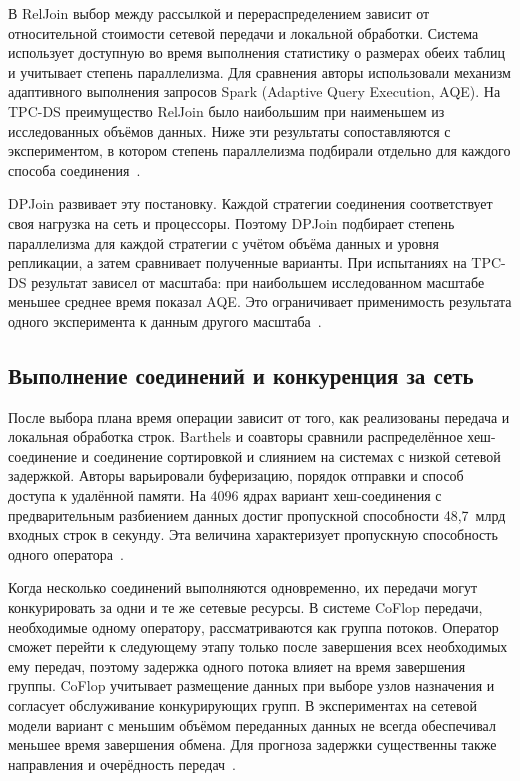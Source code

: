 \documentclass[a4paper, final]{article}
\begin{document}
	В RelJoin выбор между рассылкой и перераспределением зависит от относительной стоимости сетевой передачи и локальной обработки. Система использует доступную во время выполнения статистику о размерах обеих таблиц и учитывает степень параллелизма. Для сравнения авторы использовали механизм адаптивного выполнения запросов Spark (Adaptive Query Execution, AQE). На TPC-DS преимущество RelJoin было наибольшим при наименьшем из исследованных объёмов данных. Ниже эти результаты сопоставляются с экспериментом, в котором степень параллелизма подбирали отдельно для каждого способа соединения~\cite{liang2024,turkmen2026}.
	
	DPJoin развивает эту постановку. Каждой стратегии соединения соответствует своя нагрузка на сеть и процессоры. Поэтому DPJoin подбирает степень параллелизма для каждой стратегии с учётом объёма данных и уровня репликации, а затем сравнивает полученные варианты. При испытаниях на TPC-DS результат зависел от масштаба: при наибольшем исследованном масштабе меньшее среднее время показал AQE. Это ограничивает применимость результата одного эксперимента к данным другого масштаба~\cite{turkmen2026}.
	
	\subsection{Выполнение соединений и конкуренция за сеть}
	
	После выбора плана время операции зависит от того, как реализованы передача и локальная обработка строк. Barthels и соавторы сравнили распределённое хеш-соединение и соединение сортировкой и слиянием на системах с низкой сетевой задержкой. Авторы варьировали буферизацию, порядок отправки и способ доступа к удалённой памяти. На 4096 ядрах вариант хеш-соединения с предварительным разбиением данных достиг пропускной способности 48,7~млрд входных строк в секунду. Эта величина характеризует пропускную способность одного оператора~\cite{barthels2017}.
	
	Когда несколько соединений выполняются одновременно, их передачи могут конкурировать за одни и те же сетевые ресурсы. В системе CoFlop передачи, необходимые одному оператору, рассматриваются как группа потоков. Оператор сможет перейти к следующему этапу только после завершения всех необходимых ему передач, поэтому задержка одного потока влияет на время завершения группы. CoFlop учитывает размещение данных при выборе узлов назначения и согласует обслуживание конкурирующих групп. В экспериментах на сетевой модели вариант с меньшим объёмом переданных данных не всегда обеспечивал меньшее время завершения обмена. Для прогноза задержки существенны также направления и очерёдность передач~\cite{coflop2023}.
	
\end{document}
